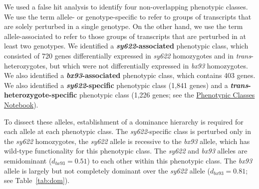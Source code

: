 \documentclass[8pt, twocolumn]{article}
\newcommand{\gene}[1]{\mbox{\emph{#1}}}
\newcommand{\dpy}{\gene{mdt-12}}
\begin{document}

We used a false hit analysis to identify four non-overlapping phenotypic classes.
We use the term allele- or genotype-specific to refer
to groups of transcripts that are solely perturbed in a single genotype. On the
other hand, we use the term allele-associated to refer to those groups of
transcripts that are perturbed in at least two genotypes. We identified a
\textbf{\emph{sy622}-associated} phenotypic class, which consisted of 720 genes
differentially expressed in \emph{sy622} homozygotes and in
\emph{trans}-heterozygotes, but which were not differentially expressed in
\emph{bx93} homozygotes. We also identified a \textbf{\emph{bx93}-associated}
phenotypic class, which contains 403 genes. We also identified a
\textbf{\emph{sy622}-specific} phenotypic class (1,841 genes) and a
\textbf{\emph{trans}-heterozygote-specific} phenotypic class (1,226 genes; see
the
\href{https://wormlabcaltech.github.io/med-cafe/notebook/phenotypic_classes.html}{
Phenotypic Classes Notebook}).




To dissect these alleles, establishment of a dominance hierarchy is required for
each allele at each phenotypic class. The \emph{sy622}-specific class is
perturbed only in the \emph{sy622} homozygotes, the \emph{sy622} allele is
recessive to the \emph{bx93} allele, which has wild-type functionality for this
phenotypic class. The \emph{sy622} and \emph{bx93} alleles are semidominant
($d_{bx93} = 0.51$) to each other within this phenotypic class.  The \emph{bx93}
allele is largely but not completely dominant over the \emph{sy622} allele
($d_{bx93}=0.81$; see Table~\ref{tab:dom}).
\end{document}
